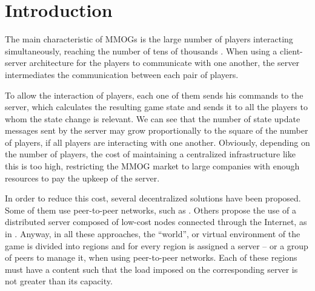 \documentclass[acmtocl]{acmtrans2m}
\title{\titulo}
\author{CARLOS EDUARDO B. BEZERRA\\JOÃO L. D. COMBA\\CLÁUDIO F. R. GEYER\\Universidade Federal do Rio Grande do Sul}
\begin{document}
\setcounter{page}{111}

\maketitle


\section{Introduction}

The main characteristic of MMOGs is the large number of players interacting simultaneously, reaching the number of tens of thousands \cite{schiele2007rpp}. When using a client-server architecture for the players to communicate with one another, the server intermediates the communication between each pair of players.

To allow the interaction of players, each one of them sends his commands to the server, which calculates the resulting game state and sends it to all the players to whom the state change is relevant. We can see that the number of state update messages sent by the server may grow proportionally to the square of the number of players, if all players are interacting with one another. Obviously, depending on the number of players, the cost of maintaining a centralized infrastructure like this is too high, restricting the MMOG market to large companies with enough resources to pay the upkeep of the server.

In order to reduce this cost, several decentralized solutions have been proposed. Some of them use peer-to-peer networks, such as \cite{schiele2007rpp,rieche2007ppb,hampel2006ppa,elrhalibi2005abm,iimura2004zfg,knutsson2004pps}. Others propose the use of a distributed server composed of low-cost nodes connected through the Internet, as in \cite{ng2002msa,chertov:olb,lee2003sdl,assiotis2006dam}. Anyway, in all these approaches, the ``world'', or virtual environment of the game is divided into regions and for every region is assigned a server -- or a group of peers to manage it, when using peer-to-peer networks. Each of these regions must have a content such that the load imposed on the corresponding server is not greater than its capacity.
\end{document}
